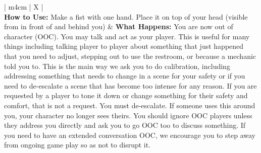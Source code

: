 \documentclass[sheet]{GL2020}
\begin{document}
\begin{tabularx}{\textwidth}{| m{4cm} | X |}
\hline
	\\
\hline
	\textbf{How to Use:} Make a fist with one hand. Place it on top of your head (visible from in front of and behind you) & \textbf{What Happens:} You are now out of character (OOC). You may talk and act as your player. This is useful for many things including talking player to player about something that just happened that you need to adjust, stepping out to use the restroom, or because a mechanic told you to. \newline\newline This is the main way we ask you to do calibration, including addressing something that needs to change in a scene for your safety or if you need to de-escalate a scene that has become too intense for any reason. If you are requested by a player to tone it down or change something for their safety and comfort, that is not a request. You must de-escalate. \newline\newline If someone uses this around you, your character no longer sees theirs. You should ignore OOC players unless they address you directly and ask you to go OOC too to discuss something. If you need to have an extended conversation OOC, we encourage you to step away from ongoing game play so as not to disrupt it. \\
\hline
	\\
\hline
\hline
	\\

\end{tabularx}
\end{document}

